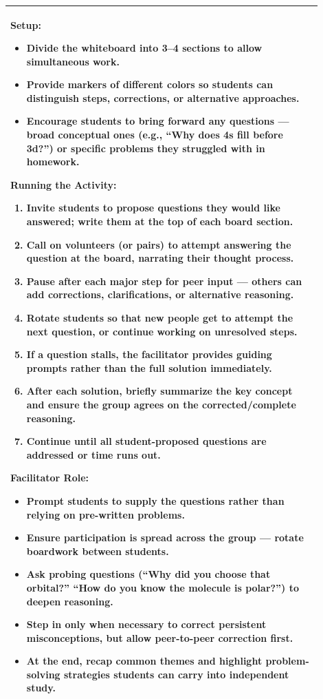 \documentclass{article}
\begin{document}
{\begin{tabular}{|p{0.9\linewidth}|}
\textbf{Setup:}  
\begin{itemize}  
    \item Divide the whiteboard into 3–4 sections to allow simultaneous work.  
    \item Provide markers of different colors so students can distinguish steps, corrections, or alternative approaches.  
    \item Encourage students to bring forward any questions — broad conceptual ones (e.g., “Why does 4s fill before 3d?”) or specific problems they struggled with in homework.  
\end{itemize}  

\textbf{Running the Activity:}  
\begin{enumerate}  
    \item Invite students to propose questions they would like answered; write them at the top of each board section.  
    \item Call on volunteers (or pairs) to attempt answering the question at the board, narrating their thought process.  
    \item Pause after each major step for peer input — others can add corrections, clarifications, or alternative reasoning.  
    \item Rotate students so that new people get to attempt the next question, or continue working on unresolved steps.  
    \item If a question stalls, the facilitator provides guiding prompts rather than the full solution immediately.  
    \item After each solution, briefly summarize the key concept and ensure the group agrees on the corrected/complete reasoning.  
    \item Continue until all student-proposed questions are addressed or time runs out.  
\end{enumerate}  

\textbf{Facilitator Role:}  
\begin{itemize}  
    \item Prompt students to supply the questions rather than relying on pre-written problems.  
    \item Ensure participation is spread across the group — rotate boardwork between students.  
    \item Ask probing questions (“Why did you choose that orbital?” “How do you know the molecule is polar?”) to deepen reasoning.  
    \item Step in only when necessary to correct persistent misconceptions, but allow peer-to-peer correction first.  
    \item At the end, recap common themes and highlight problem-solving strategies students can carry into independent study.  
\end{itemize}  
\vspace{0.2cm}
\\ \hline
\end{tabular}
\newpage

}
\end{document}
